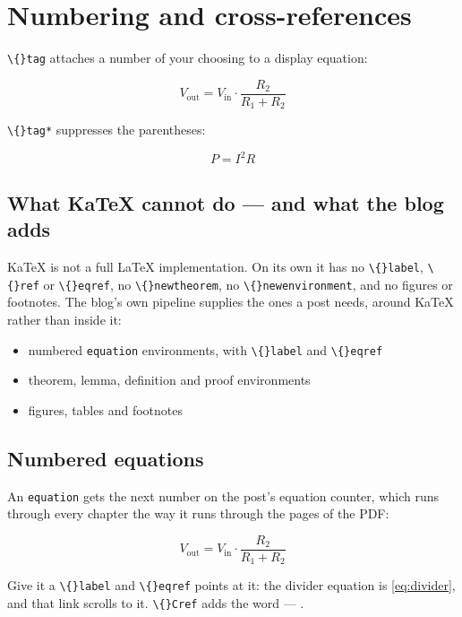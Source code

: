 \section{Numbering and cross-references}

\texttt{\textbackslash\{\}tag} attaches a number of your choosing to a display equation:

\[
V_{\text{out}} = V_{\text{in}} \cdot \frac{R_2}{R_1 + R_2} \tag{7.1}
\]

\texttt{\textbackslash\{\}tag*} suppresses the parentheses:

\[
P = I^2 R \tag*{\star}
\]

\subsection{What KaTeX cannot do — and what the blog adds}

KaTeX is not a full LaTeX implementation. On its own it has no \texttt{\textbackslash\{\}label}, \texttt{\textbackslash\{\}ref} or \texttt{\textbackslash\{\}eqref}, no \texttt{\textbackslash\{\}newtheorem}, no \texttt{\textbackslash\{\}newenvironment}, and no figures or footnotes. The blog's own pipeline supplies the ones a post needs, around KaTeX rather than inside it:

\begin{itemize}
  \item numbered \texttt{equation} environments, with \texttt{\textbackslash\{\}label} and \texttt{\textbackslash\{\}eqref}
  \item theorem, lemma, definition and proof environments
  \item figures, tables and footnotes
\end{itemize}

\subsection{Numbered equations}

An \texttt{equation} gets the next number on the post's equation counter, which runs through every chapter the way it runs through the pages of the PDF:

\begin{equation}
V_{\text{out}} = V_{\text{in}} \cdot \frac{R_2}{R_1 + R_2}
\label{eq:divider}
\end{equation}

Give it a \texttt{\textbackslash\{\}label} and \texttt{\textbackslash\{\}eqref} points at it: the divider equation is \eqref{eq:divider}, and that link scrolls to it. \texttt{\textbackslash\{\}Cref} adds the word — .

